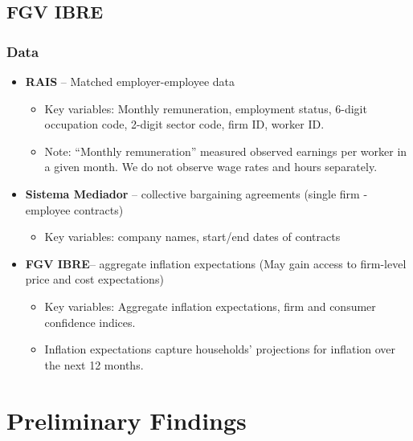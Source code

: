 \documentclass[aspectratio=169]{beamer}
\begin{document}
		\subsection{FGV IBRE}	
			\begin{frame}
				\frametitle{Data}
				\begin{itemize}
					\item \textbf{RAIS} \--- Matched employer-employee data 
					\begin{itemize}
						\item Key variables: Monthly remuneration, employment status, 6-digit occupation code, 2-digit sector code, firm ID, worker ID.
						\item Note: ``Monthly remuneration'' measured observed earnings per worker in a given month. We do not observe wage rates and hours separately.
					\end{itemize}
					\item \textbf{Sistema Mediador} \--- collective bargaining agreements (single firm - employee contracts)
			 		\begin{itemize}
				 		\item Key variables: company names, start/end dates of contracts
					 \end{itemize}
		
				 \hyperlink{typical_CBA}{}
					\item \textbf{FGV IBRE}\--- aggregate inflation expectations	(May gain access to firm-level price and cost expectations)
					\begin{itemize}
						\item Key variables: Aggregate inflation expectations, firm and consumer confidence indices. 
						\item Inflation expectations capture households' projections for inflation over the next 12 months.
					\end{itemize}
				\end{itemize}
			\end{frame}

	\section{Preliminary Findings}

\end{document}
